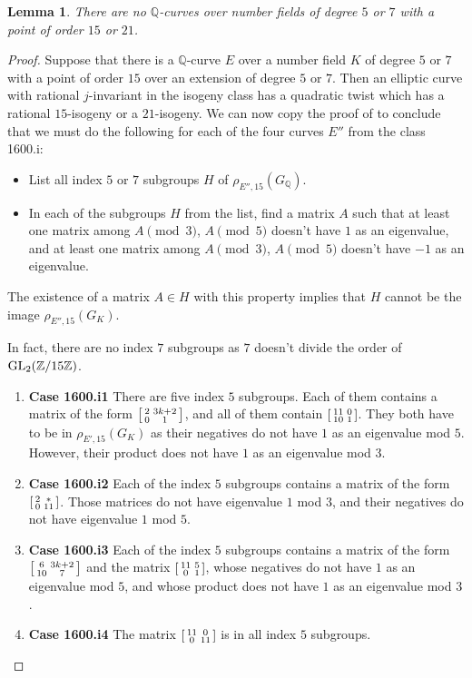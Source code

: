 \documentclass[10pt,leqno]{amsart}
\newcommand\sm[1]{\begin{bsmallmatrix}#1\end{bsmallmatrix}}
\newcommand{\Z}{\mathbb{Z}}
\newcommand{\Q}{\mathbb{Q}}
\newcommand{\GL}{\textnormal{GL}}
\newtheorem{lemma}[theorem]{Lemma}
\theoremstyle{definition}
\theoremstyle{remark}
\numberwithin{theorem}{section}
\begin{document}
\begin{lemma}
    There are no $\Q$-curves over number fields of degree $5$ or $7$ with a point of order $15$ or $21$.
\end{lemma}
\begin{proof}
    Suppose that there is a $\Q$-curve $E$ over a number field $K$ of degree $5$ or $7$ with a point of order $15$ over an extension of degree $5$ or $7$. Then an elliptic curve with rational $j$-invariant in the isogeny class has a quadratic twist which has a rational $15$-isogeny or a $21$-isogeny. We can now copy the proof of  to conclude that we must do the following for each of the four curves $E''$ from the class 1600.i:

\begin{itemize}
    \item List all index $5$ or $7$ subgroups $H$ of $\rho_{E'', 15}(G_\Q)$.
    \item In each of the subgroups $H$ from the list, find a matrix $A$ such that at least one matrix among $A \pmod 3$,  $A \pmod 5$ doesn't have $1$ as an eigenvalue, and at least one matrix among $A \pmod 3$, $A \pmod 5$ doesn't have $-1$ as an eigenvalue. 
\end{itemize}

The existence of a matrix $A \in H$ with this property implies that $H$ cannot be the image $\rho_{E'', 15}(G_K)$.

In fact, there are no index $7$ subgroups as $7$ doesn't divide the order of $\GL_2(\Z/15\Z)$.


\begin{enumerate}
    \item \textbf{Case 1600.i1} There are five index $5$ subgroups. Each of them contains a matrix of the form $\sm{2 & 3k+2 \\ 0 & 1}$, and all of them contain $\sm{11 & 0 \\ 10 & 1}$. They both have to be in $\rho_{E', 15}(G_K)$ as their negatives do not have $1$ as an eigenvalue mod $5$. However, their product does not have $1$ as an eigenvalue mod $3$. 

    
    \item \textbf{Case 1600.i2}
    Each of the index $5$ subgroups contains a matrix of the form $\sm{2 & * \\ 0 & 11}$. Those matrices do not have eigenvalue $1$ mod $3$, and their negatives do not have eigenvalue $1$ mod $5$.
    \item \textbf{Case 1600.i3} Each of the index $5$ subgroups contains a matrix of the form $\sm{6 & 3k+2 \\ 10 & 7}$ and the matrix $\sm{11 & 5 \\ 0 &1}$, whose negatives do not have $1$ as an eigenvalue mod $5$, and whose product does not have $1$ as an eigenvalue mod $3$.
    \item \textbf{Case 1600.i4} The matrix $\sm{11 & 0 \\ 0 & 11}$ is in all index $5$ subgroups.
\end{enumerate}


\end{proof}
\end{document}
